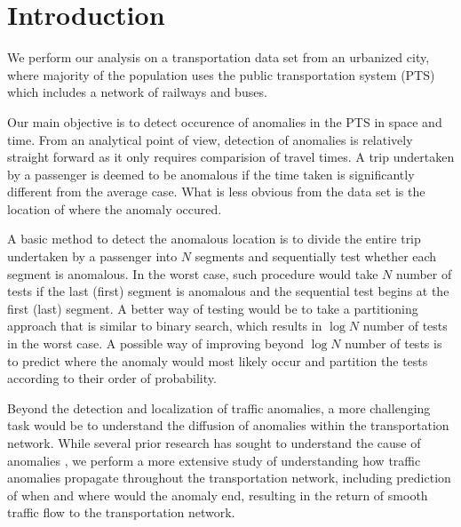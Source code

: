 \documentclass{sig-alternate}
\begin{document}
\section{Introduction}

We perform our analysis on a transportation data set from an urbanized city, where majority of the population uses the public transportation system (PTS) which includes a network of railways and buses. 

Our main objective is to detect occurence of anomalies in the PTS in space and time. From an analytical point of view, detection of anomalies is relatively straight forward as it only requires comparision of travel times. A trip undertaken by a passenger is deemed to be anomalous if the time taken is significantly different from the average case. What is less obvious from the data set is the location of where the anomaly occured.

A basic method to detect the anomalous location is to divide the entire trip undertaken by a passenger into $N$ segments and sequentially test whether each segment is anomalous. In the worst case, such procedure would take $N$ number of tests if the last (first) segment is anomalous and the sequential test begins at the first (last) segment. A better way of testing would be to take a partitioning approach that is similar to binary search, which results in $\log N$ number of tests in the worst case. A possible way of improving beyond $\log N$ number of tests is to predict where the anomaly would most likely occur and partition the tests according to their order of probability.

Beyond the detection and localization of traffic anomalies, a more challenging task would be to understand the diffusion of anomalies within the transportation network. While several prior research has sought to understand the cause of anomalies \cite{Chawla2012,Liu2011}, we perform a more extensive study of understanding how traffic anomalies propagate throughout the transportation network, including prediction of when and where would the anomaly end, resulting in the return of smooth traffic flow to the transportation network. %


\end{document}
